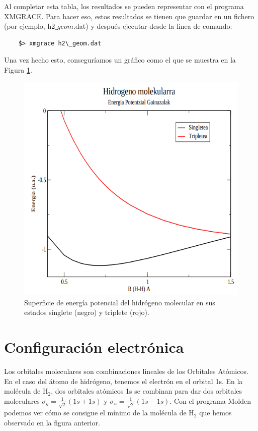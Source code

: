 \documentclass{tufte-book}
\begin{document}
Al completar esta tabla, los resultados se pueden representar con 
el programa XMGRACE. Para hacer eso, estos resultados se tienen 
que guardar en un fichero (por ejemplo, h2$\_{geom}$.dat) y 
después ejecutar desde la línea de comando:
\begin{verbatim}
    $> xmgrace h2\_geom.dat
\end{verbatim}
Una vez hecho esto, conseguríamos un gráfico como el que se muestra en la Figura \ref{fig:sep}.
\begin{figure}[h!]
\centering
\includegraphics[scale=0.3]{PES_H2.png}
\caption{Superficie de energía potencial del hidrógeno molecular en
sus estados singlete (negro) y triplete (rojo).}
\label{fig:sep}
\end{figure}

\section{Configuración electrónica}
Los orbitales moleculares son combinaciones lineales de los
Orbitales Atómicos. En el caso del átomo de hidrógeno, tenemos el
electrón en el orbital 1s. En la molécula de H$_2$, dos orbitales
atómicos 1s se combinan para dar dos orbitales moleculares
$\sigma_g=\frac{1}{\sqrt{2}}(1s+1s)$ y 
$\sigma_u=\frac{1}{\sqrt{2}}(1s-1s)$. Con el programa Molden
podemos ver cómo se consigue el mínimo de la molécula de H$_2$ 
que  hemos observado en la figura anterior.
\end{document}
